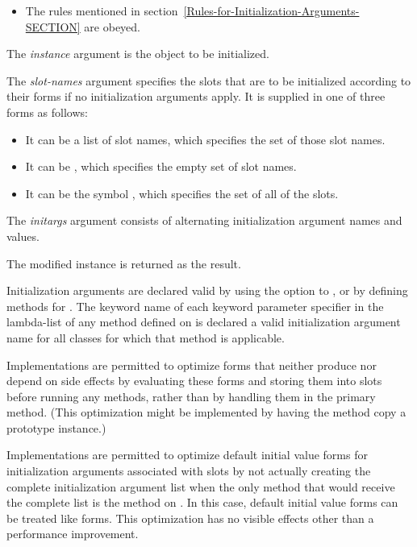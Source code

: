 \begin{defun}
\begin{itemize}
\item  The rules mentioned in section~\ref{Rules-for-Initialization-Arguments-SECTION} are obeyed.

\end{itemize}





The {\it instance\/} argument is the object to be initialized.

The {\it slot-names\/} argument specifies the slots that are to be
initialized according to their  forms if no
initialization arguments apply.  It is supplied in one of three forms
as follows:

\begin{itemize}

\item  It can be a list of slot names, which specifies
the set of those slot names.

\item  It can be , which specifies the empty set of
slot names.

\item  It can be the symbol , which specifies the set of
all of the slots.

\end{itemize}

The {\it initargs\/} argument consists of alternating initialization 
argument names and values.


The modified instance is returned as the result.


Initialization arguments are declared valid by using the 
 option to , or by defining methods for 
.  The keyword name of each keyword parameter
specifier in the lambda-list of any method defined on 
 is declared a valid initialization argument
name for all classes for which that method is applicable.

Implementations are permitted to optimize  forms that 
neither produce nor depend on side effects by evaluating these forms
and storing them into slots before running any 
 methods, rather than by handling them in the
primary  method.  (This optimization might
be implemented by having the  method copy a
prototype instance.)

Implementations are permitted to optimize default initial value forms
for initialization arguments associated with slots by not actually
creating the complete initialization argument list when the only method
that would receive the complete list is the method on 
.  In this case, default initial value forms can be 
treated like  forms.  This optimization has no visible
effects other than a performance improvement.


\end{defun}
